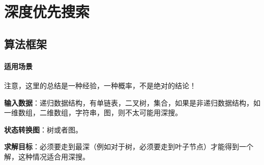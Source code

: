 \chapter{深度优先搜索}


\section{算法框架} %
\label{sec:dfs-template}


\subsubsection{适用场景}
注意，这里的总结是一种经验，一种概率，不是绝对的结论！

\textbf{输入数据}：递归数据结构，有单链表，二叉树，集合，如果是非递归数据结构，如一维数组，二维数组，字符串，图，则不太可能用深搜。

\textbf{状态转换图}：树或者图。

\textbf{求解目标}：必须要走到最深（例如对于树，必须要走到叶子节点）才能得到一个解，这种情况适合用深搜。



